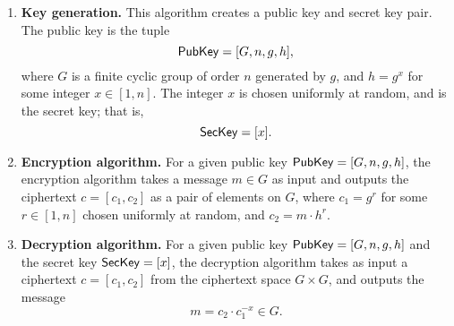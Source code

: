 \begin{enumerate}
    \item {\bf Key generation.} This algorithm creates a public key and secret key 
          pair. The public key is the tuple 
          \[ {\sf PubKey} = [G, n, g, h], \] 
          where $G$ is a finite cyclic group of order $n$ generated by $g$, and 
          $h = g^x$ for some integer $x \in [1, n]$. The integer $x$ is chosen 
          uniformly at random, and is the secret key; that is, 
          \[ {\sf SecKey} = [x]. \] 
    \item {\bf Encryption algorithm.} For a given public key ${\sf PubKey} = 
          [G, n, g, h]$, the encryption algorithm takes a message $m \in G$ as 
          input and outputs the ciphertext $c = [c_1, c_2]$ as a pair of elements 
          on $G$, where $c_1 = g^r$ for some $r \in [1, n]$ chosen uniformly 
          at random, and $c_2 = m \cdot h^r$. 
    \item {\bf Decryption algorithm.} For a given public key ${\sf PubKey} = 
          [G, n, g, h]$ and the secret key ${\sf SecKey} = [x]$, the decryption 
          algorithm takes as input a ciphertext $c = [c_1, c_2]$ from the 
          ciphertext space $G \times G$, and outputs the message 
          \[ m = c_2 \cdot c_1^{-x} \in G. \] 
\end{enumerate}